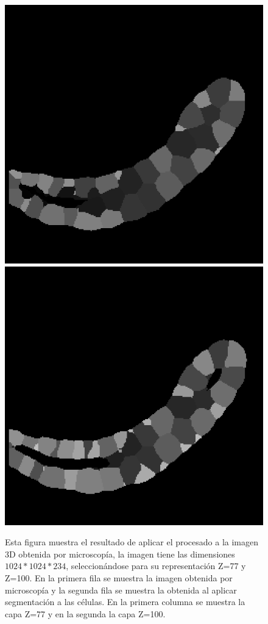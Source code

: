 \begin{figure}[ht]
\includegraphics[scale=0.2]{img/target 04_1a Z=77.png}
\includegraphics[scale=0.2]{img/target 04_1a Z=100.png}
\caption{Esta figura muestra el resultado de aplicar el procesado a la imagen 3D obtenida por microscopía, la imagen tiene las dimensiones $1024*1024*234$, seleccionándose para su representación Z=77 y Z=100. En la primera fila se muestra la imagen obtenida por microscopía y la segunda fila se muestra la obtenida al aplicar segmentación a las células. En la primera columna se muestra la capa Z=77 y en la segunda la capa Z=100.}\bigskip
\label{fig:ejemplo1_segmentacion}
\end{figure}

